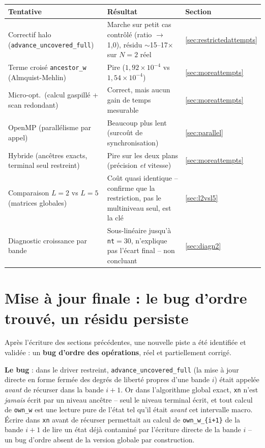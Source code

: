 \documentclass[11pt]{article}
\begin{document}
\begin{center}
\begin{tabular}{@{}p{5.2cm}p{4cm}p{4.8cm}@{}}
\toprule
Tentative & Résultat & Section \\
\midrule
Correctif halo (\texttt{advance\_uncovered\_full}) & Marche sur petit cas contrôlé (ratio $\to$1,0), résidu $\sim$15--17$\times$ sur $N{=}2$ réel & \ref{sec:restrictedattempts} \\
Terme croisé \texttt{ancestor\_w} (Almquist-Mehlin) & Pire ($1{,}92\times10^{-4}$ vs $1{,}54\times10^{-4}$) & \ref{sec:moreattempts} \\
Micro-opt.\ (calcul gaspillé + scan redondant) & Correct, mais aucun gain de temps mesurable & \ref{sec:moreattempts} \\
OpenMP (parallélisme par appel) & Beaucoup plus lent (surcoût de synchronisation) & \ref{sec:parallel} \\
Hybride (ancêtres exacts, terminal seul restreint) & Pire sur les deux plans (précision \emph{et} vitesse) & \ref{sec:moreattempts} \\
Comparaison $L{=}2$ vs $L{=}5$ (matrices globales) & Coût quasi identique -- confirme que la restriction, pas le multiniveau seul, est la clé & \ref{sec:l2vsl5} \\
Diagnostic croissance par bande & Sous-linéaire jusqu'à \texttt{nt}$=30$, n'explique pas l'écart final -- non concluant & \ref{sec:diagn2} \\
\bottomrule
\end{tabular}
\end{center}

\section{Mise à jour finale : le bug d'ordre trouvé, un résidu persiste}
\label{sec:orderingfix}

Après l'écriture des sections précédentes, une nouvelle piste a été
identifiée et validée : un \textbf{bug d'ordre des opérations}, réel et
partiellement corrigé.

\textbf{Le bug} : dans le driver restreint, \texttt{advance\_uncovered\_full}
(la mise à jour directe en forme fermée des degrés de liberté propres
d'une bande $i$) était appelée \emph{avant} de récurser dans la bande
$i+1$. Or dans l'algorithme global exact, \texttt{xn} n'est \emph{jamais}
écrit par un niveau ancêtre -- seul le niveau terminal écrit, et tout
calcul de \texttt{own\_w} est une lecture pure de l'état tel qu'il était
\emph{avant} cet intervalle macro. Écrire dans \texttt{xn} avant de
récurser permettait au calcul de \texttt{own\_w\_\{i+1\}} de la bande
$i+1$ de lire un état déjà contaminé par l'écriture directe de la bande
$i$ -- un bug d'ordre absent de la version globale par construction.
\end{document}
